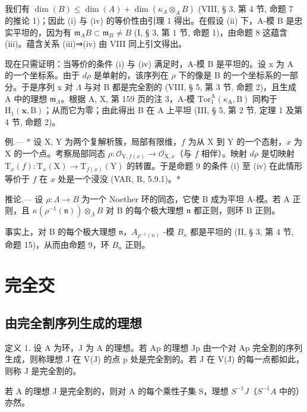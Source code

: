 我们有 \(\dim(B) \leqslant \dim(A) + \dim(\kappa_A \otimes_A B)\) (VIII, § 3, 第 4 节, 命题 7 的推论 1)；因此 (i) 与 (iv) 的等价性由引理 1 得出。在假设 (ii) 下，A-模 B 是忠实平坦的，因为有 \(\mathfrak{m}_A B \subset \mathfrak{m}_B \neq B\) (I, § 3, 第 1 节, 命题 1)，由命题 8 这蕴含 (iii)。蕴含关系 (iii)⇒(iv) 由 VIII 同上引文得出。

现在只需证明：当等价的条件 (i) 与 (iv) 满足时，A-模 B 是平坦的。设 x 为 A 的一个坐标系。由于 \(d\rho\) 是单射的，该序列在 \(\rho\) 下的像是 B 的一个坐标系的一部分。于是序列 x 对 \(\Lambda\) 与对 B 都是完全割的 (VIII, § 5, 第 3 节, 命题 2)，且生成 A 中的理想 \(\mathfrak{m}_{\Lambda}\)。根据 A, X, 第 159 页的注 3，A-模 \(\mathrm{Tor}_{1}^{\mathrm{A}}(\kappa_{\mathrm{A}},\mathrm{B})\) 同构于 \(\mathrm{H}_{1}(\mathbf{x},\mathrm{B})\)；从而它为零；由此得出 B 在 A 上平坦 (III, § 5, 第 2 节, 定理 1 及第 4 节, 命题 2)。

例.--- * 设 X, Y 为两个复解析簇，局部有限维，\(f\) 为从 X 到 Y 的一个态射，\(x\) 为 X 的一个点。考察局部同态 \(\rho: \mathcal{O}_{\mathrm{Y}, f(x)} \to \mathcal{O}_{\mathrm{X}, x}\)（与 \(f\) 相伴）。映射 \(d\rho\) 是切映射 \(\mathrm{T}_x(f): \mathrm{T}_x(\mathrm{X}) \to \mathrm{T}_{f(x)}(\mathrm{Y})\) 的转置。于是命题 9 的条件 (i) 至 (iv) 在此情形等价于 \(f\) 在 \(x\) 处是一个浸没 (VAR, R, 5.9.1)。*

推论.--- 设 \(\rho: \Lambda \to B\) 为一个 Noether 环的同态，它使 B 成为平坦 A-模。若 A 正则，且 \(\kappa(\rho^{-1}(\mathfrak{n})) \otimes_{\Lambda} B\) 对 B 的每个极大理想 \(\mathfrak{n}\) 都正则，则环 B 正则。

事实上，对 B 的每个极大理想 \(\mathfrak{n}\)，\(A_{\rho^{-1}(n)}\) -模 \(B_{n}\) 都是平坦的 (II, § 3, 第 4 节, 命题 15)，从而由命题 9，环 \(B_{n}\) 正则。

\section{完全交}

\subsection{由完全割序列生成的理想}

定义 1. 设 A 为环，J 为 A 的理想。若 Ap 的理想 Jp 由一个对 Ap 完全割的序列生成，则称理想 J 在 V(J) 的点 p 处是完全割的。若 J 在 V(J) 的每一点都如此，则称 J 是完全割的。

若 A 的理想 J 是完全割的，则对 A 的每个乘性子集 S，理想 \(S^{-1}J\)（\(S^{-1}A\) 中的）亦然。

